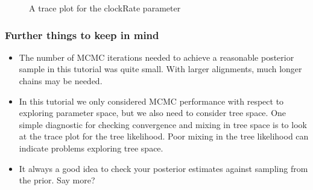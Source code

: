 \documentclass[11pt]{article}
\begin{document}
\begin{figure}[!h]
\centering
{}
\caption{\small A trace plot for the clockRate parameter}
\label{fig:tracer_run4}
\end{figure}

\bigskip
\subsubsection{Further things to keep in mind}

\begin{itemize}
\item The number of MCMC iterations needed to achieve a reasonable posterior sample in this tutorial was quite small. With larger alignments, much longer chains may be needed.
\item In this tutorial we only considered MCMC performance with respect to exploring parameter space, but we also need to consider tree space. One simple diagnostic for checking convergence and mixing in tree space is to look at the trace plot for the tree likelihood. Poor mixing in the tree likelihood can indicate problems exploring tree space.
\item It always a good idea to check your posterior estimates against sampling from the prior. Say more?  
\end{itemize}
\end{document}
